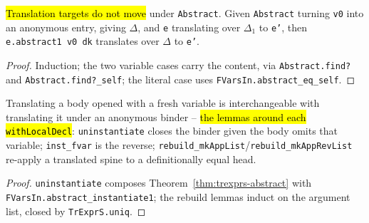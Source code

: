 \begin{theorem}
\label{thm:trexprs-abstract}
\leanok
{}
 \hl{Translation targets do not move} under \texttt{Abstract}. Given \texttt{Abstract} turning \texttt{v0} into an anonymous entry, giving $\Delta$, and \texttt{e} translating over $\Delta_1$ to \texttt{e'}, then \texttt{e.abstract1 v0 dk} translates over $\Delta$ to \texttt{e'}.
\end{theorem}
\begin{proof}
\leanok
{} Induction; the two variable cases carry the content, via \texttt{Abstract.find?} and \texttt{Abstract.find?\_self}; the literal case uses \texttt{FVarsIn.abstract\_eq\_self}.
\end{proof}

\begin{lemma}
\label{family:trexprs-uninstantiate}
\leanok
{}
 Translating a body opened with a fresh variable is interchangeable with translating it under an anonymous binder -- \hl{the lemmas around each \texttt{withLocalDecl}}: \texttt{uninstantiate} closes the binder given the body omits that variable; \texttt{inst\_fvar} is the reverse; \texttt{rebuild\_mkAppList}/\texttt{rebuild\_mkAppRevList} re-apply a translated spine to a definitionally equal head.
\end{lemma}
\begin{proof}
\leanok
{} \texttt{uninstantiate} composes Theorem~\ref{thm:trexprs-abstract} with \texttt{FVarsIn.abstract\_instantiate1}; the rebuild lemmas induct on the argument list, closed by \texttt{TrExprS.uniq}.
\end{proof}

